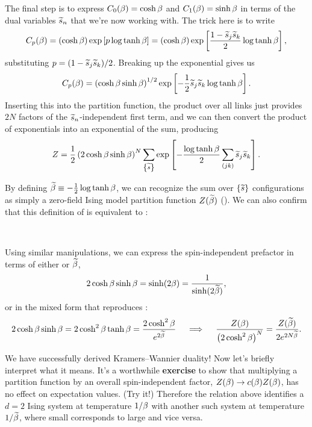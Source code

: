 The final step is to express $C_0(\beta) = \cosh \beta$ and $C_1(\beta) = \sinh \beta$ in terms of the dual variables $\widetilde s_n$ that we're now working with.
The trick here is to write
\begin{equation*}
  C_p(\beta) = \left(\cosh \beta\right) \exp\left[p \log \tanh \beta\right] = \left(\cosh \beta\right) \exp\left[\frac{1 - \widetilde s_j \widetilde s_k}{2} \log \tanh \beta\right],
\end{equation*}
substituting $p = (1 - \widetilde s_j \widetilde s_k) / 2$.
Breaking up the exponential gives us
\begin{equation*}
  C_p(\beta) = \left(\cosh\beta \sinh\beta\right)^{1 / 2} \exp\left[-\frac{1}{2} \widetilde s_j \widetilde s_k \log \tanh \beta\right].
\end{equation*}
Inserting this into the partition function, the product over all links just provides $2N$ factors of the $\widetilde s_n$-independent first term, and we can then convert the product of exponentials into an exponential of the sum, producing
\begin{equation*}
  Z = \frac{1}{2} \left(2\cosh\beta \sinh\beta\right)^N \sum_{\left\{\widetilde s\right\}} \exp\left[-\frac{\log \tanh \beta}{2} \sum_{(jk)} \widetilde s_j \widetilde s_k\right].
\end{equation*}

By defining $\widetilde{\beta} \equiv -\frac{1}{2}\log \tanh \beta$, we can recognize the sum over $\left\{\widetilde s\right\}$ configurations as simply a zero-field Ising model partition function $Z(\widetilde{\beta})$ ().
We can also confirm that this definition of \betw is equivalent to :
\begin{mdframed}
  \ \\[100 pt]
\end{mdframed}
Using similar manipulations, we can express the spin-independent prefactor in terms of either \be or $\widetilde{\beta}$,
\begin{equation*}
  2\cosh\beta \sinh\beta = \sinh(2\beta) = \frac{1}{\sinh(2\widetilde{\beta})},
\end{equation*}
or in the mixed form that reproduces :
\begin{equation*}
  2\cosh\beta \sinh\beta = 2\cosh^2 \beta \tanh\beta = \frac{2\cosh^2 \beta}{e^{2\widetilde{\beta}}} \quad \implies \quad \frac{Z(\beta)}{\left(2\cosh^2\beta\right)^N} = \frac{Z(\widetilde{\beta})}{2e^{2N\widetilde{\beta}}}.
\end{equation*}

We have successfully derived Kramers--Wannier duality!
Now let's briefly interpret what it means.
It's a worthwhile \textbf{exercise} to show that multiplying a partition function by an overall spin-independent factor, $Z(\beta) \to c(\beta) Z(\beta)$, has no effect on expectation values.
(Try it!)
Therefore the relation above identifies a $d = 2$ Ising system at temperature $1 / \beta$ with another such system at temperature $1 / \widetilde{\beta}$, where small \be corresponds to large \betw and vice versa.


